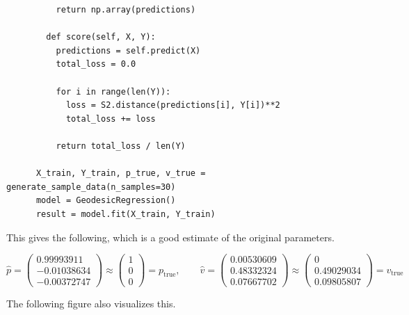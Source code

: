 \begin{example}
\begin{lstlisting}
          return np.array(predictions)
        
        def score(self, X, Y):
          predictions = self.predict(X)
          total_loss = 0.0
          
          for i in range(len(Y)):
            loss = S2.distance(predictions[i], Y[i])**2
            total_loss += loss
          
          return total_loss / len(Y)

      X_train, Y_train, p_true, v_true = generate_sample_data(n_samples=30)
      model = GeodesicRegression()
      result = model.fit(X_train, Y_train)
    \end{lstlisting}
    
    This gives the following, which is a good estimate of the original parameters. 

    \begin{equation}
      \hat{p} = \begin{pmatrix} 0.99993911 \\ -0.01038634 \\ -0.00372747 \end{pmatrix} \approx \begin{pmatrix} 1 \\ 0 \\ 0 \end{pmatrix} = p_{\mathrm{true}}, \qquad 
      \hat{v} = \begin{pmatrix} 0.00530609 \\ 0.48332324 \\ 0.07667702 \end{pmatrix} \approx \begin{pmatrix} 0 \\ 0.49029034 \\ 0.09805807 \end{pmatrix} = v_{\mathrm{true}}
    \end{equation}

    The following figure also visualizes this. 


\end{example}
